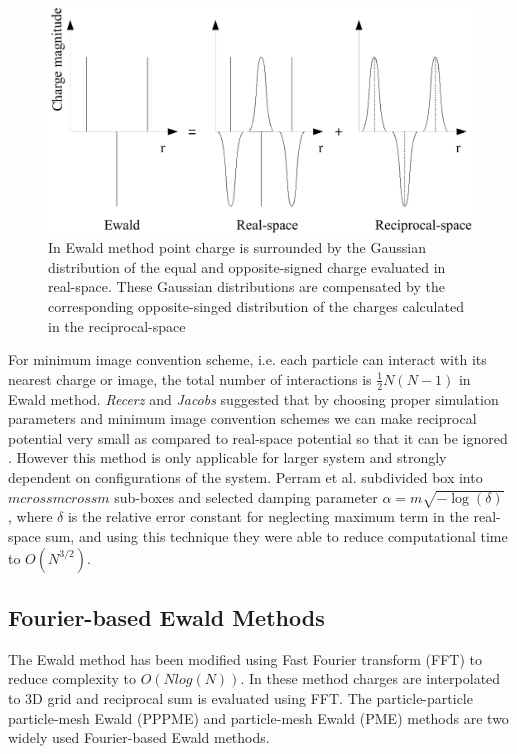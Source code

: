 \begin{figure}[tpb]
  \begin{center}
    \centerline{\includegraphics[scale=0.8]{Ewaldsum.pdf}}
    \caption{In Ewald method point charge is surrounded by the Gaussian distribution of the equal and opposite-signed charge evaluated in real-space. These Gaussian distributions are compensated by the corresponding opposite-singed distribution of the charges calculated in the reciprocal-space }
    \label{fig:Ewaldsum}
  \end{center}
\end{figure}

For minimum image convention scheme, i.e. each particle can interact with its nearest charge or image, the total number of interactions is $\frac{1}{2}N(N-1)$ in Ewald method. \textit{Recerz} and \textit{Jacobs} suggested that by choosing proper simulation parameters and minimum image convention schemes we can make reciprocal potential very small as compared to real-space potential so that it can be ignored \cite{Jacobs92}. However this method is only applicable for larger system and strongly dependent on configurations of the system. Perram et al. subdivided box into $m cross m cross m$ sub-boxes and selected damping parameter $\alpha = m \sqrt{-\log(\delta)}$ , where $\delta$ is the relative error constant for neglecting maximum term in the real-space sum, and using this technique they were able to reduce computational time   to $O(N^{3/2})$.

\subsection{Fourier-based Ewald Methods}
The Ewald method has been modified using Fast Fourier transform (FFT) to reduce complexity to $O(N log(N))$. In these method charges are interpolated to 3D grid and reciprocal sum is evaluated using FFT. The particle-particle particle-mesh Ewald (PPPME) and particle-mesh Ewald (PME) methods are two widely used Fourier-based Ewald methods. 
